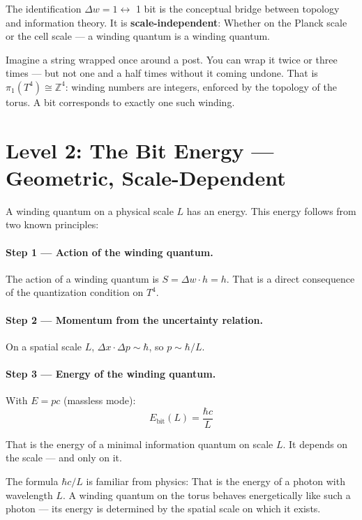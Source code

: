 The identification $\Delta w = 1 \leftrightarrow$ 1 bit is the conceptual
bridge between topology and information theory. It is
\textbf{scale-independent}: Whether on the Planck scale or the cell scale ---
a winding quantum is a winding quantum. 

\begin{laierspur}
Imagine a string wrapped once around a post.
You can wrap it twice or three times --- but not one and a half times
without it coming undone. That is $\pi_1(T^4) \cong \mathbb{Z}^4$:
winding numbers are integers, enforced by the topology of the torus.
A bit corresponds to exactly one such winding.
\end{laierspur}

\section{Level 2: The Bit Energy --- Geometric, Scale-Dependent}

A winding quantum on a physical scale $L$ has an energy.
This energy follows from two known principles:

\paragraph{Step 1 --- Action of the winding quantum.}
The action of a winding quantum is $S = \Delta w \cdot h = h$.
That is a direct consequence of the quantization condition on $T^4$.

\paragraph{Step 2 --- Momentum from the uncertainty relation.}
On a spatial scale $L$, $\Delta x \cdot \Delta p \sim \hbar$,
so $p \sim \hbar/L$.

\paragraph{Step 3 --- Energy of the winding quantum.}
With $E = pc$ (massless mode):
\[
  \boxed{E_\text{bit}(L) = \frac{\hbar c}{L}}
\]

That is the energy of a minimal information quantum on scale $L$.
It depends on the scale --- and only on it. 

\begin{laierspur}
The formula $\hbar c / L$ is familiar from physics: That is the energy
of a photon with wavelength $L$. A winding quantum on the torus behaves
energetically like such a photon --- its energy is determined by the
spatial scale on which it exists.
\end{laierspur}

